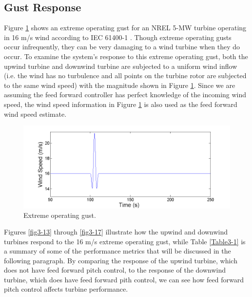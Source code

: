 \subsection{Gust Response}\label{section3-4-1}

Figure \ref{fig3-12} shows an extreme operating gust for an NREL 5-MW turbine operating in 16 m/s wind according to IEC 61400-1 \cite{IEC2005}. Though extreme operating gusts occur infrequently, they can be very damaging to a wind turbine when they do occur. To examine the system's response to this extreme operating gust, both the upwind turbine and downwind turbine are subjected to a uniform wind inflow (i.e. the wind has no turbulence and all points on the turbine rotor are subjected to the same wind speed) with the magnitude shown in Figure \ref{fig3-12}. Since we are assuming the feed forward controller has perfect knowledge of the incoming wind speed, the wind speed information in Figure \ref{fig3-12} is also used as the feed forward wind speed estimate.


\begin{figure}[htbp]
	\centering
		\includegraphics[trim = {1cm 0 2cm 0}, clip, width = \linewidth]{Figures/ch3Figures/fig3-12.png}
		
	\caption{Extreme operating gust.}
	\label{fig3-12}
\end{figure}


Figures \ref{fig3-13} through \ref{fig3-17} illustrate how the upwind and downwind turbines respond to the 16 m/s extreme operating gust, while Table \ref{Table3-1} is a summary of some of the performance metrics that will be discussed in the following paragraph. By comparing the response of the upwind turbine, which does not have feed forward pitch control, to the response of the downwind turbine, which does have feed forward pith control, we can see how feed forward pitch control affects turbine performance.

